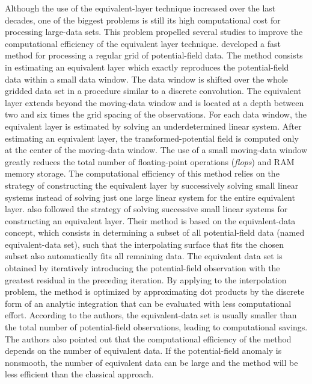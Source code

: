 Although the use of the equivalent-layer technique increased over the last decades, one of the biggest 
problems is still its high computational cost for processing large-data sets. 
This problem propelled several studies to improve the computational efficiency of the 
equivalent layer technique. 
\citet{leao-silva1989} developed a fast method for processing a regular grid of potential-field data.
The method consists in estimating an equivalent layer which exactly reproduces the potential-field data 
within a small data window. The data window is shifted over the whole gridded data set in a procedure similar 
to a discrete convolution. 
The equivalent layer extends beyond the moving-data window and is located at a depth between two and six 
times the grid spacing of the observations. For each data window, the equivalent layer is estimated by 
solving an underdetermined linear system.
After estimating an equivalent layer, the transformed-potential field is computed only at the center of the 
moving-data window. The use of a small moving-data window greatly reduces the total number of floating-point 
operations (\textit{flops}) and RAM memory storage. The computational efficiency of this method relies on the 
strategy of constructing the equivalent layer by successively solving small linear systems instead of solving 
just one large linear system for the entire equivalent layer. 
\citet{mendonca-silva1994} also followed the strategy of solving successive small linear systems for 
constructing an equivalent layer. Their method is based on the  equivalent-data concept, which 
consists in determining a subset of all potential-field data (named equivalent-data set), such that the 
interpolating surface that fits the chosen subset also automatically fits all remaining data. 
The equivalent data set is obtained by iteratively introducing the potential-field observation with the 
greatest residual in the preceding iteration. By applying to the interpolation problem, the method is 
optimized by approximating dot products by the discrete form of an analytic integration that can be 
evaluated with less computational effort. According to the authors, the equivalent-data set is usually 
smaller than the total number of potential-field observations, leading to computational savings. 
The authors also pointed out that the computational efficiency of the method depends on the number of 
equivalent data. If the potential-field anomaly is nonsmooth, the number of equivalent data can be large and 
the method will be less efficient than the classical approach.

